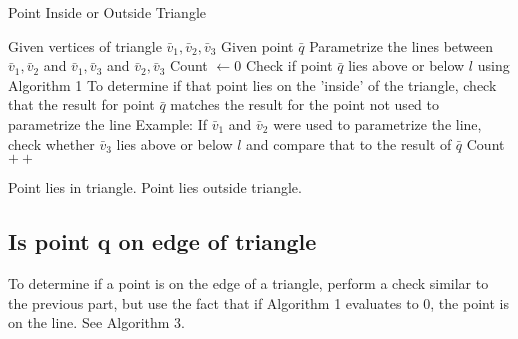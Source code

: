 \documentclass[a4paper,10pt]{scrartcl}
\begin{document}
   
\begin{algorithm}[h!]
  \caption{Point Inside or Outside Triangle}\label{}
  \begin{algorithmic}
    \State Given vertices of triangle $\bar v_1, \bar v_2, \bar v_3$
    \State Given point $\bar q$
    \State Parametrize the lines between $\bar v_1, \bar v_2$ and $\bar v_1, \bar v_3$ and $\bar v_2, \bar v_3$
    \State Count $\gets 0$
      \State Check if point $\bar q$ lies above or below $l$ using Algorithm 1
      \State To determine if that point lies on the 'inside' of the triangle, check that the result
      for point $\bar q$ matches the result for the point not used to parametrize the line 
      \State Example: If $\bar v_1$ and $\bar v_2$ were used to parametrize the line, check whether $\bar v_3$ lies above or below $l$ and compare
      that to the result of $\bar q$
	\State Count$++$
      \EndIf
    \EndFor
    
      \State Point lies in triangle.
    \Else
      \State Point lies outside triangle.
    \EndIf  
  \end{algorithmic}
\end{algorithm}

\newpage

\subsection{Is point q on edge of triangle}

To determine if a point is on the edge of a triangle, perform a check similar to the previous part, but use
the fact that if Algorithm 1 evaluates to $0$, the point is on the line. See Algorithm 3.
\end{document}

